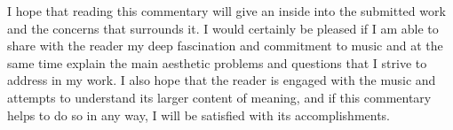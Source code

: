 I hope that reading this commentary will give an inside into the submitted work and the concerns that surrounds it. I would certainly be pleased if I am able to share with the reader my deep fascination and commitment to music and at the same time explain the main aesthetic problems and questions that I strive to address in my work. I also hope that the reader is engaged with the music and attempts to understand its larger content of meaning, and if this commentary helps to do so in any way, I will be satisfied with its accomplishments.

\label{ch:preface}